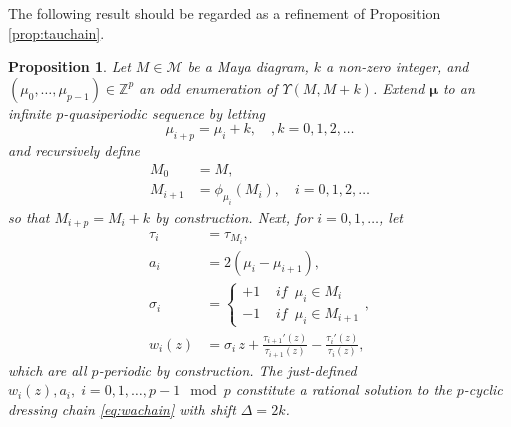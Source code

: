 \documentclass{amsart}
\newtheorem{proposition}{Proposition}
\theoremstyle{definition}
\newcommand{\Z}{\mathbb{Z}}
\newcommand{\bmu}{{\boldsymbol{\mu}}}
\newcommand{\cM}{\mathcal{M}}
\begin{document}
The following result should be regarded as a refinement of Proposition
\ref{prop:tauchain}.
\begin{proposition}
  \label{prop:Mtauw}
  Let $M\in \cM$ be a Maya diagram, $k$ a non-zero integer, and
  $(\mu_0,\ldots, \mu_{p-1})\in \Z^p$ an odd enumeration of
  $\Upsilon(M,M+k)$. Extend $\bmu$ to an infinite $p$-quasiperiodic
  sequence by letting
  \[ \mu_{i+p} = \mu_i+k,\quad, k=0,1,2,\ldots \]
  and recursively define
  \begin{equation}
    \label{eq:Mchain}
    \begin{aligned}
      M_0 &=M,\\
      M_{i+1} &= \phi_{\mu_i}(M_{i}),\quad    i=0,1,2,\ldots
    \end{aligned}
  \end{equation}
  so that $M_{i+p} = M_i+k$ by construction.  Next, for
  $i=0,1,\ldots$, let
  \begin{equation}
    \label{eq:HM2w} 
    \begin{aligned}
      \tau_i &= \tau_{M_i},\\
      a_i&=2(\mu_i-\mu_{i+1}),\\
      \sigma_i&=\begin{cases}
        +1 & \textit{ if } \, \mu_i\in M_{i} \\
        -1 & \textit{ if } \, \mu_i\in M_{i+1} 
      \end{cases},\\
      w_i(z)&= \sigma_{i} \,z+ \frac{\tau_{i+1}'(z)}{\tau_{i+1}(z)}-
      \frac{\tau_i'(z)}{\tau_i(z)},
    \end{aligned}
  \end{equation}
  which are all $p$-periodic by construction.  The just-defined
  $w_i(z), a_i,\; i=0,1,\ldots, p-1\mod p$ constitute a rational
  solution to the $p$-cyclic dressing chain \eqref{eq:wachain} with
  shift $\Delta=2k$.
\end{proposition}
\end{document}
